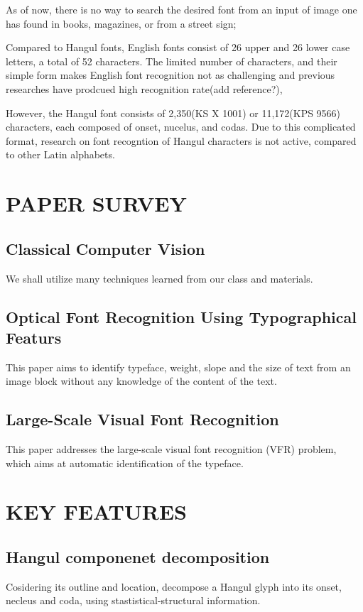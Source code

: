 \documentclass[%
 reprint,
nofootinbib,
nobibnotes,
amsmath,amssymb,
aps,
]{revtex4-1}
\begin{document}
As of now, there is no way to search the desired font from an input of image one has found in books,
magazines, or from a street sign;

Compared to Hangul fonts, English fonts consist of 26 upper and 26 lower case
letters, a total of 52 characters. The limited number of characters, and their
simple form makes English font recognition not as challenging and previous
researches have prodcued high recognition rate(add reference?),

However, the Hangul font consists of 2,350(KS X 1001) or 11,172(KPS 9566)
characters, each composed of onset, nucelus, and codas. Due to this complicated
format, research on font recogntion of Hangul characters is not active, compared to other Latin alphabets.


\section{\label{sec:level1}PAPER SURVEY}

\subsection{\label{sec:level2}Classical Computer Vision}
We shall utilize many techniques learned from our class and materials.

\subsection{\label{sec:level2}Optical Font Recognition Using Typographical
Featurs}
This paper\cite{zramdini} aims to identify typeface, weight, slope and the size of
text from an image block without any knowledge of the content of the text.

\subsection{\label{sec:level2}Large-Scale Visual Font Recognition}
This paper\cite{chen} addresses the large-scale visual font recognition (VFR)
problem, which aims at automatic identification of the typeface.

\section{\label{sec:level2}KEY FEATURES}
\subsection{\label{sec:level3} Hangul componenet decomposition}
Cosidering its outline and location, decompose a Hangul glyph into its onset,
necleus and coda, using stastistical-structural information.
\end{document}
